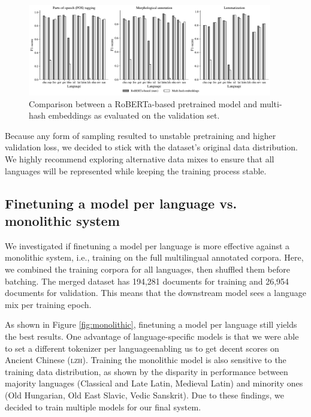 \documentclass[11pt]{article}
\begin{document}
\begin{figure}[t]
  \centering
  \includegraphics[width=0.95\textwidth]{figures/hashembed.pdf}
  \caption{Comparison between a RoBERTa-based pretrained model and multi-hash embeddings \cite{miranda-etal-2022-multi} as evaluated on the validation set.}
  \label{fig:hashembed}
\end{figure}



Because any form of sampling resulted to unstable pretraining and higher validation loss, we decided to stick with the dataset's original data distribution.
We highly recommend exploring alternative data mixes to ensure that all languages will be represented while keeping the training process stable.

\subsection{Finetuning a model per language vs. monolithic system}

We investigated if finetuning a model per language is more effective against a monolithic system, i.e., training on the full multilingual annotated corpora.
Here, we combined the training corpora for all languages, then shuffled them before batching.
The merged dataset has 194,281 documents for training and 26,954 documents for validation.
This means that the downstream model sees a language mix per training epoch.

As shown in Figure \ref{fig:monolithic}, finetuning a model per language still yields the best results.
One advantage of language-specific models is that we were able to set a different tokenizer per language\textemdash enabling us to get decent scores on Ancient Chinese (\textsc{lzh}).
Training the monolithic model is also sensitive to the training data distribution, as shown by the disparity in performance between majority languages (Classical and Late Latin, Medieval Latin) and minority ones (Old Hungarian, Old East Slavic, Vedic Sanskrit).
Due to these findings, we decided to train multiple models for our final system.
\end{document}
